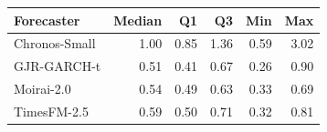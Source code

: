 \begin{tabular}{lrrrrr}
\toprule
Forecaster & Median & Q1 & Q3 & Min & Max \\
\midrule
  Chronos-Small & 1.00 & 0.85 & 1.36 & 0.59 & 3.02 \\
  GJR-GARCH-t & 0.51 & 0.41 & 0.67 & 0.26 & 0.90 \\
  Moirai-2.0 & 0.54 & 0.49 & 0.63 & 0.33 & 0.69 \\
  TimesFM-2.5 & 0.59 & 0.50 & 0.71 & 0.32 & 0.81 \\
\bottomrule
\end{tabular}